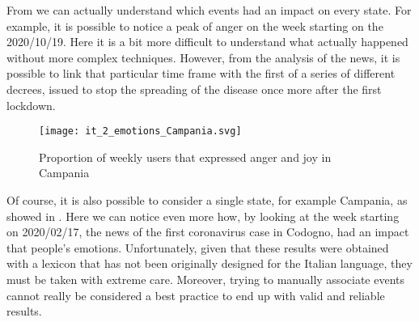 From  we can actually understand which events had an impact on every state. For example, it is possible to notice a peak of anger on the week starting on the 2020/10/19. Here it is a bit more difficult to understand what actually happened without more complex techniques. However, from the analysis of the news, it is possible to link that particular time frame with the first of a series of different decrees, issued to stop the spreading of the disease once more after the first lockdown. 

\begin{figure}[H]
	\centering
    	\texttt{[image: it\_2\_emotions\_Campania.svg]}
    	\caption{Proportion of weekly users that expressed anger and joy in Campania}
    	\label{fig:it-2-emotions-campania}
\end{figure}

Of course, it is also possible to consider a single state, for example Campania, as showed in . Here we can notice even more how, by looking at the week starting on 2020/02/17, the news of the first coronavirus case in Codogno, had an impact that people's emotions. Unfortunately, given that these results were obtained with a lexicon that has not been originally designed for the Italian language, they must be taken with extreme care. Moreover, trying to manually associate events cannot really be considered a best practice to end up with valid and reliable results.
